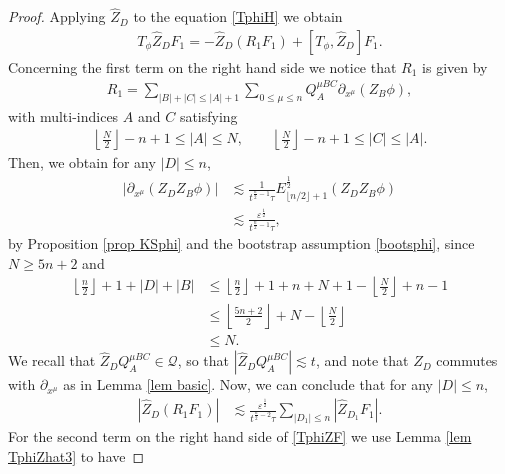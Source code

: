 \documentclass[10pt,a4paper]{amsart}
\newcommand{\cQ}{{\mathcal Q}}
\begin{document}
\begin{proof}
Applying $ \hat{ Z }_D $ to the equation \eqref{TphiH} we obtain
\begin{align}
T_\phi \hat{ Z }_D F_1 = - \hat{ Z }_D \left( R_1 F_1 \right) + \left[ T_\phi , \hat{ Z }_D \right] F_1 . \label{TphiZF}
\end{align}
Concerning the first term on the right hand side we notice that $ R_1 $ is given by
\begin{align*}
R_1 = \sum_{ | B | + | C | \leq | A | + 1 } \sum_{ 0 \leq \mu \leq n } Q^{ \mu B C }_{ A } \partial_{ x^\mu } ( Z_B \phi ) ,
\end{align*}
with multi-indices $ A $ and $ C $ satisfying
\begin{align*}
\left\lfloor \frac{ N }{ 2 } \right\rfloor - n +1 \leq | A | \leq N , \qquad \left\lfloor \frac{ N }{ 2 } \right\rfloor - n +1 \leq | C | \leq | A | .
\end{align*}
Then, we obtain for any $ | D | \leq n $,
\begin{align*}
| \partial_{ x^\mu } ( Z_{ D } Z_B \phi ) | & \lesssim \frac{ 1 }{ t^{ \frac{ n }{ 2 } - 1 } \tau } E_{ \lfloor n / 2 \rfloor + 1 }^{ \frac12 } ( Z_{ D } Z_B \phi ) \\
& \lesssim \frac{ \varepsilon^{ \frac{ 1 }{ 2 } } }{ t^{ \frac{ n }{ 2 } - 1 } \tau } ,
\end{align*}
by Proposition \ref{prop KSphi} and the bootstrap assumption \eqref{bootsphi}, since $ N \geq 5 n + 2 $ and
\begin{align*}
\left\lfloor \frac{ n }{ 2 } \right\rfloor + 1 + | D | + | B | & \leq \left\lfloor \frac{ n }{ 2 } \right\rfloor + 1 + n + N + 1 - \left\lfloor \frac{ N }{ 2 } \right\rfloor + n - 1 \\
& \leq \left\lfloor \frac{ 5 n + 2 }{ 2 } \right\rfloor + N - \left\lfloor \frac{ N }{ 2 } \right\rfloor \\
& \leq N .
\end{align*}
We recall that $ \hat{ Z }_{ D } Q^{ \mu B C }_{ A } \in \cQ $, so that $ | \hat{ Z }_{ D } Q^{ \mu B C }_{ A } | \lesssim t $, and note that $ Z_{ D } $ commutes with $ \partial_{ x^\mu } $ as in Lemma \ref{lem basic}. Now, we can conclude that for any $ | D | \leq n $,
\begin{align*}
| \hat{ Z }_D ( R_1 F_1 ) | & \lesssim \frac{ \varepsilon^{ \frac{ 1 }{ 2 } } }{ t^{ \frac{ n }{ 2 } - 2 } \tau } \sum_{ | D_1 | \leq n } | \hat{ Z }_{ D_1 } F_1 | .
\end{align*}
For the second term on the right hand side of \eqref{TphiZF} we use Lemma \ref{lem TphiZhat3} to have

\end{proof}
\end{document}
